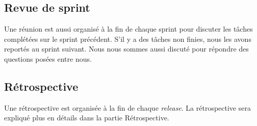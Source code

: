 \documentclass[a4paper,12pt]{article}
\begin{document}
\subsection{Revue de sprint}
Une réunion est aussi organisé à la fin de chaque sprint pour discuter les tâches complétées sur le sprint précédent. S'il y a des tâches non finies, nous les avons reportés au sprint suivant. Nous nous sommes aussi discuté pour répondre des questions posées entre nous.

\subsection{Rétrospective}
Une rétrospective est organisée à la fin de chaque \textit{release}. La rétrospective sera expliqué plus en détails dans la partie Rétrospective.
\end{document}
